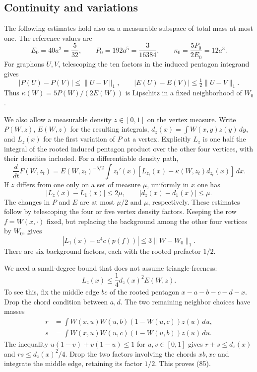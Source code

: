 \documentclass[11pt]{amsart}
\theoremstyle{definition}
\theoremstyle{remark}
\begin{document}
\subsection{Continuity and variations}

The following estimates hold also on a measurable subspace of total
mass at most one. The reference values are
\[
 E_0=40a^2=\frac5{32},\qquad
 P_0=192a^5=\frac3{16384},\qquad
 \kappa_0=\frac{5P_0}{2E_0}=12a^3.
\]
For graphons $U,V$, telescoping the ten factors in the induced
pentagon integrand gives
\begin{equation}\tag{81}\label{eq:l1-continuity}
 |P(U)-P(V)|\leq\lVert U-V\rVert_1,\qquad
 |E(U)-E(V)|\leq\tfrac12\lVert U-V\rVert_1.
\end{equation}
Thus $\kappa(W)=5P(W)/(2E(W))$ is Lipschitz in a fixed neighborhood
of $W_0$.

We also allow a measurable density $z\in[0,1]$ on the vertex measure.
Write $P(W,z)$, $E(W,z)$ for the resulting integrals,
$d_z(x)=\int W(x,y)z(y)\,dy$, and $L_z(x)$ for the first variation
of $P$ at a vertex. Explicitly $L_z$ is one half the integral of the
rooted induced pentagon product over the other four vertices, with
their densities included. For a differentiable density path,
\begin{equation}\tag{82}\label{eq:vertex-density-variation}
 \frac{d}{dt}F(W,z_t)
 =E(W,z_t)^{-5/2}\int z_t'(x)
       [L_{z_t}(x)-\kappa(W,z_t)d_{z_t}(x)]\,dx.
\end{equation}
If $z$ differs from one only on a set of measure $\mu$, uniformly in
$x$ one has
\begin{equation}\tag{83}\label{eq:density-deletion-errors}
 |L_z(x)-L_1(x)|\leq2\mu,\qquad
 |d_z(x)-d_1(x)|\leq\mu.
\end{equation}
The changes in $P$ and $E$ are at most $\mu/2$ and $\mu$,
respectively. These estimates follow by telescoping the four or five
vertex density factors. Keeping the row $f=W(x,\cdot)$ fixed, but
replacing the background among the other four vertices by $W_0$, gives
\begin{equation}\tag{84}\label{eq:background-replacement-error}
 |L_1(x)-a^4c(p(f))|\leq3\lVert W-W_0\rVert_1.
\end{equation}
There are six background factors, each with the rooted prefactor $1/2$.

We need a small-degree bound that does not assume triangle-freeness:
\begin{equation}\tag{85}\label{eq:local-small-degree-link}
 L_z(x)\leq\frac14d_z(x)^2E(W,z).
\end{equation}
To see this, fix the middle edge $bc$ of the rooted pentagon
$x-a-b-c-d-x$. Drop the chord condition between $a,d$. The two
remaining neighbor choices have masses
\begin{align*}
 r&=\int W(x,u)W(u,b)(1-W(u,c))z(u)\,du,\\
 s&=\int W(x,u)W(u,c)(1-W(u,b))z(u)\,du.
\end{align*}
The inequality $u(1-v)+v(1-u)\leq1$ for $u,v\in[0,1]$ gives
$r+s\leq d_z(x)$ and $rs\leq d_z(x)^2/4$. Drop the two factors
involving the chords $xb,xc$ and integrate the middle edge, retaining
its factor $1/2$. This proves (85).
\end{document}
